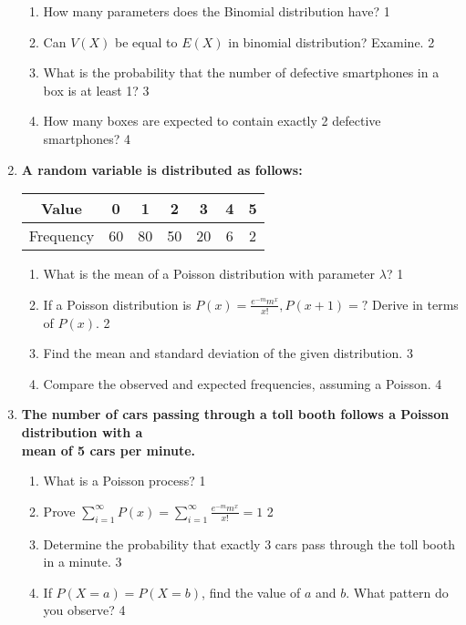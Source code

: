 \documentclass{article}
\begin{document}
\begin{enumerate}
  \begin{enumerate}
  
   \item How many parameters does the Binomial distribution have? \hfill 1
   
   \item Can $V(X)$ be equal to $E(X)$ in binomial distribution? Examine. \hfill 2
    \item  
	What is the probability that the number of defective smartphones in a box 
	is at least 1? \hfill 3
    \item
	How many boxes are expected to contain exactly 2 defective smartphones? \hfill 4
  \end{enumerate}
  
    \item  
\textbf{A random variable is distributed as follows:}  

\begin{table}[h]
\centering
\begin{tabular}{c|c|c|c|c|c|c}
Value & 0 & 1 & 2 & 3 & 4 & 5 \\ \hline
Frequency & 60 & 80 & 50 & 20 & 6 & 2
\end{tabular}
\end{table}

\begin{enumerate}
 \item What is the mean of a Poisson distribution with parameter \( \lambda \)? \hfill 1
 
 \item If a Poisson distribution is $P(x) = \frac{e^{-m}m^x}{x!}, P(x+1) = ?$ 
 Derive in terms of $P(x)$. \hfill 2
    \item  
    Find the mean and standard deviation of the given distribution. \hfill 3
    \item  
    Compare the observed and expected frequencies, assuming a Poisson. \hfill 4
\end{enumerate}
  
   \item
	  \textbf{The number of cars passing through a toll booth follows a 
	  Poisson distribution with a \\ mean of 5 cars per minute.} 
  
  \begin{enumerate}
    \item What is a Poisson process?  \hfill 1
    \item Prove $\displaystyle \sum_{i=1}^{\infty} P(x) = \sum_{i=1}^{\infty} \frac{e^{-m} m^x}{x!} = 1$ \hfill 2
    \item  
	Determine the probability that exactly 3 cars pass through the toll 
	booth in a minute. \hfill 3
    \item
	If $P(X = a) = P(X = b)$, find the value of $a$ and $b$. What pattern do 
	you observe? \hfill 4
  \end{enumerate}
  

\end{enumerate}
\end{document}
